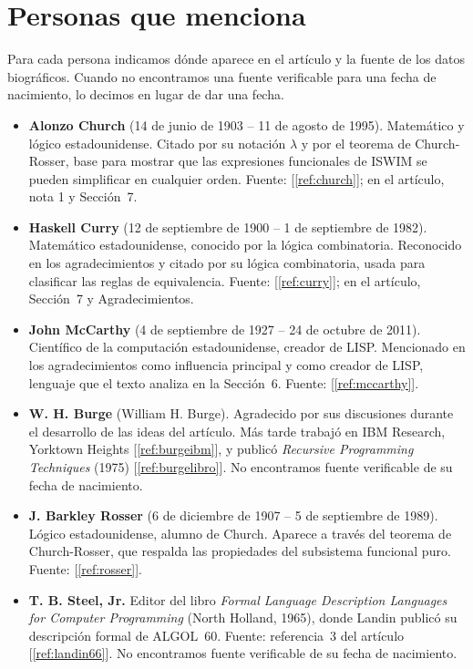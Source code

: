 \documentclass[11pt,twoside,openany]{report}
\newcommand{\fuente}[1]{{\color{acento}[\ref{#1}]}}
\begin{document}
\section{Personas que menciona}

Para cada persona indicamos dónde aparece en el artículo y la fuente de los datos biográficos. Cuando no encontramos una fuente verificable para una fecha de nacimiento, lo decimos en lugar de dar una fecha.

{\small
\begin{itemize}[itemsep=1pt, topsep=2pt]
  \item \textbf{Alonzo Church} (14 de junio de 1903 -- 11 de agosto de 1995). Matemático y lógico estadounidense. Citado por su notación $\lambda$ y por el teorema de Church-Rosser, base para mostrar que las expresiones funcionales de ISWIM se pueden simplificar en cualquier orden. Fuente: \fuente{ref:church}; en el artículo, nota 1 y Sección~7.
  \item \textbf{Haskell Curry} (12 de septiembre de 1900 -- 1 de septiembre de 1982). Matemático estadounidense, conocido por la lógica combinatoria. Reconocido en los agradecimientos y citado por su lógica combinatoria, usada para clasificar las reglas de equivalencia. Fuente: \fuente{ref:curry}; en el artículo, Sección~7 y Agradecimientos.
  \item \textbf{John McCarthy} (4 de septiembre de 1927 -- 24 de octubre de 2011). Científico de la computación estadounidense, creador de LISP. Mencionado en los agradecimientos como influencia principal y como creador de LISP, lenguaje que el texto analiza en la Sección~6. Fuente: \fuente{ref:mccarthy}.
  \item \textbf{W. H. Burge} (William H. Burge). Agradecido por sus discusiones durante el desarrollo de las ideas del artículo. Más tarde trabajó en IBM Research, Yorktown Heights \fuente{ref:burgeibm}, y publicó \emph{Recursive Programming Techniques} (1975) \fuente{ref:burgelibro}. No encontramos fuente verificable de su fecha de nacimiento.
  \item \textbf{J. Barkley Rosser} (6 de diciembre de 1907 -- 5 de septiembre de 1989). Lógico estadounidense, alumno de Church. Aparece a través del teorema de Church-Rosser, que respalda las propiedades del subsistema funcional puro. Fuente: \fuente{ref:rosser}.
  \item \textbf{T. B. Steel, Jr.} Editor del libro \emph{Formal Language Description Languages for Computer Programming} (North Holland, 1965), donde Landin publicó su descripción formal de ALGOL~60. Fuente: referencia~3 del artículo \fuente{ref:landin66}. No encontramos fuente verificable de su fecha de nacimiento.

\end{itemize}}
\end{document}
